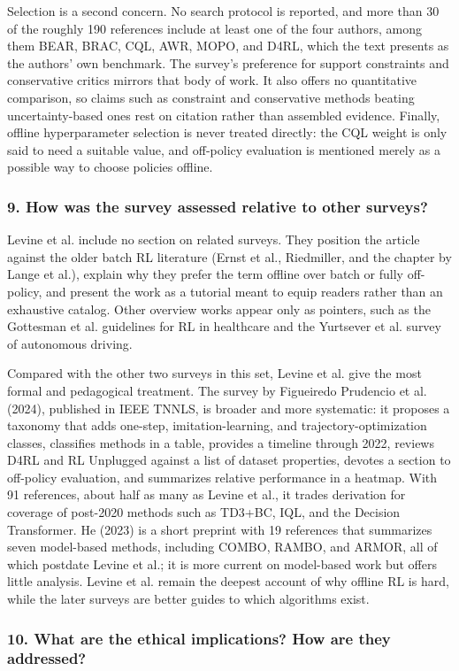\documentclass[11pt]{article}
\newcommand{\question}[1]{\subsubsection*{#1}}
\begin{document}
Selection is a second concern. No search protocol is reported, and more than 30 of the roughly 190 references include at least one of the four authors, among them BEAR, BRAC, CQL, AWR, MOPO, and D4RL, which the text presents as the authors' own benchmark. The survey's preference for support constraints and conservative critics mirrors that body of work. It also offers no quantitative comparison, so claims such as constraint and conservative methods beating uncertainty-based ones rest on citation rather than assembled evidence. Finally, offline hyperparameter selection is never treated directly: the CQL weight is only said to need a suitable value, and off-policy evaluation is mentioned merely as a possible way to choose policies offline.

\question{9. How was the survey assessed relative to other surveys?}

Levine et al. include no section on related surveys. They position the article against the older batch RL literature (Ernst et al., Riedmiller, and the chapter by Lange et al.), explain why they prefer the term offline over batch or fully off-policy, and present the work as a tutorial meant to equip readers rather than an exhaustive catalog. Other overview works appear only as pointers, such as the Gottesman et al. guidelines for RL in healthcare and the Yurtsever et al. survey of autonomous driving.

Compared with the other two surveys in this set, Levine et al. give the most formal and pedagogical treatment. The survey by Figueiredo Prudencio et al. (2024), published in IEEE TNNLS, is broader and more systematic: it proposes a taxonomy that adds one-step, imitation-learning, and trajectory-optimization classes, classifies methods in a table, provides a timeline through 2022, reviews D4RL and RL Unplugged against a list of dataset properties, devotes a section to off-policy evaluation, and summarizes relative performance in a heatmap. With 91 references, about half as many as Levine et al., it trades derivation for coverage of post-2020 methods such as TD3+BC, IQL, and the Decision Transformer. He (2023) is a short preprint with 19 references that summarizes seven model-based methods, including COMBO, RAMBO, and ARMOR, all of which postdate Levine et al.; it is more current on model-based work but offers little analysis. Levine et al. remain the deepest account of why offline RL is hard, while the later surveys are better guides to which algorithms exist.

\question{10. What are the ethical implications? How are they addressed?}
\end{document}
